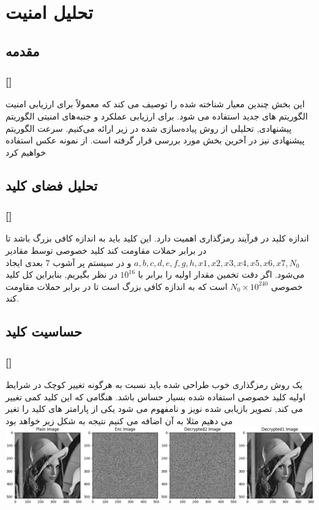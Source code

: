 \documentclass[xcolor=dvipsnames, professionalfonts, 11pt]{beamer}
\newcommand*{\makeframetitle}{\frametitle{\insertsection \hspace{0.1em} {\footnotesize [\insertsubsection]}}}
\begin{document}
\section{تحلیل امنیت}
\subsection{مقدمه}
\begin{frame}
\makeframetitle
این بخش چندین معیار شناخته شده را توصیف می کند که معمولاً برای ارزیابی امنیت الگوریتم های جدید استفاده می شود. برای ارزیابی عملکرد و جنبه‌های امنیتی الگوریتم پیشنهادی, تحلیلی از روش پیاده‌سازی شده در زیر ارائه می‌کنیم. سرعت الگوریتم پیشنهادی نیز در آخرین بخش مورد بررسی قرار گرفته است.
از نمونه عکس  استفاده خواهیم کرد
\end{frame}

\subsection{تحلیل فضای کلید}
\begin{frame}
\makeframetitle
\begin{center}
    اندازه کلید در فرآیند رمزگذاری اهمیت دارد. این کلید باید به اندازه کافی بزرگ باشد تا در برابر حملات  مقاومت کند
کلید خصوصی توسط مقادیر 
\( a, b, c, d, e, f, g, h, x1, x2, x3, x4, x5, x6, x7, N_0 \)
 و در سیستم پر آشوب 7 بعدی ایجاد می‌شود.
  اگر دقت تخمین مقدار اولیه را برابر با 
\( 10^{16} \)
  در نظر بگیریم, بنابراین کل کلید خصوصی 
\( N_0 \times 10^{240} \)
  است که به اندازه کافی بزرگ است تا در برابر حملات  مقاومت کند.
\end{center}
\end{frame}

\subsection{حساسیت کلید}
\begin{frame}
\makeframetitle
یک روش رمزگذاری خوب طراحی شده باید نسبت به هرگونه تغییر کوچک در شرایط اولیه کلید خصوصی استفاده شده بسیار حساس باشد.
هنگامی که این کلید کمی تغییر می کند, تصویر بازیابی شده نویز و نامفهوم می شود
یکی از پارامتر های کلید را تغیر می دهیم مثلا  به آن اضافه می کنیم نتیجه به شکل زیر خواهد بود
\vfill
\includegraphics[width=\textwidth]{assets/result06.png}
\end{frame}
\end{document}

